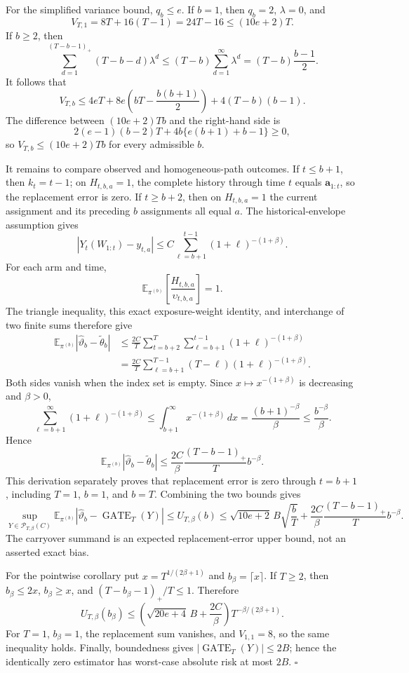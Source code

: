 For the simplified variance bound, \(q_b\le e\). If \(b=1\), then \(q_b=2\), \(\lambda=0\), and
\[
V_{T,1}=8T+16(T-1)=24T-16\le(10e+2)T.
\]
If \(b\ge2\), then
\[
\sum_{d=1}^{(T-b-1)_+}(T-b-d)\lambda^d
\le (T-b)\sum_{d=1}^{\infty}\lambda^d
=(T-b)\frac{b-1}{2}.
\]
It follows that
\[
V_{T,b}\le4eT+8e\left(bT-\frac{b(b+1)}2\right)+4(T-b)(b-1).
\]
The difference between \((10e+2)Tb\) and the right-hand side is
\[
2(e-1)(b-2)T+4b\{e(b+1)+b-1\}\ge0,
\]
so \(V_{T,b}\le(10e+2)Tb\) for every admissible \(b\).

It remains to compare observed and homogeneous-path outcomes. If \(t\le b+1\), then \(k_t=t-1\); on \(H_{t,b,a}=1\), the complete history through time \(t\) equals \(\mathbf a_{1:t}\), so the replacement error is zero. If \(t\ge b+2\), then on \(H_{t,b,a}=1\) the current assignment and its preceding \(b\) assignments all equal \(a\). The historical-envelope assumption gives
\[
|Y_t(W_{1:t})-y_{t,a}|
\le C\sum_{\ell=b+1}^{t-1}(1+\ell)^{-(1+\beta)}.
\]
For each arm and time,
\[
\mathbb E_{\pi^{(b)}}\left[\frac{H_{t,b,a}}{\upsilon_{t,b,a}}\right]=1.
\]
The triangle inequality, this exact exposure-weight identity, and interchange of two finite sums therefore give
\[
\begin{aligned}
\mathbb E_{\pi^{(b)}}|\widehat\vartheta_b-\widetilde\theta_b|
&\le\frac{2C}{T}\sum_{t=b+2}^T\sum_{\ell=b+1}^{t-1}(1+\ell)^{-(1+\beta)}\\
&=\frac{2C}{T}\sum_{\ell=b+1}^{T-1}(T-\ell)(1+\ell)^{-(1+\beta)}.
\end{aligned}
\]
Both sides vanish when the index set is empty. Since \(x\mapsto x^{-(1+\beta)}\) is decreasing and \(\beta>0\),
\[
\sum_{\ell=b+1}^{\infty}(1+\ell)^{-(1+\beta)}
\le\int_{b+1}^{\infty}x^{-(1+\beta)}\,dx
=\frac{(b+1)^{-\beta}}{\beta}
\le\frac{b^{-\beta}}{\beta}.
\]
Hence
\[
\mathbb E_{\pi^{(b)}}|\widehat\vartheta_b-\widetilde\theta_b|
\le\frac{2C}{\beta}\frac{(T-b-1)_+}{T}b^{-\beta}.
\]
This derivation separately proves that replacement error is zero through \(t=b+1\), including \(T=1\), \(b=1\), and \(b=T\). Combining the two bounds gives
\[
\sup_{Y\in\mathcal P_{T,\beta}(C)}
\mathbb E_{\pi^{(b)}}|\widehat\vartheta_b-\operatorname{GATE}_T(Y)|
\le U_{T,\beta}(b)
\le\sqrt{10e+2}\,B\sqrt{\frac bT} +\frac{2C}{\beta}\frac{(T-b-1)_+}{T}b^{-\beta}.
\]
The carryover summand is an expected replacement-error upper bound, not an asserted exact bias.

For the pointwise corollary put \(x=T^{1/(2\beta+1)}\) and \(b_\beta=\lceil x\rceil\). If \(T\ge2\), then \(b_\beta\le2x\), \(b_\beta\ge x\), and \((T-b_\beta-1)_+/T\le1\). Therefore
\[
U_{T,\beta}(b_\beta)
\le\left(\sqrt{20e+4}\,B+\frac{2C}{\beta}\right)T^{-\beta/(2\beta+1)}.
\]
For \(T=1\), \(b_\beta=1\), the replacement sum vanishes, and \(V_{1,1}=8\), so the same inequality holds. Finally, boundedness gives \(|\operatorname{GATE}_T(Y)|\le2B\); hence the identically zero estimator has worst-case absolute risk at most \(2B\). \(\square\)